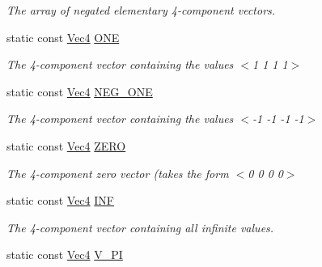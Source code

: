 \begin{DoxyCompactItemize}
\begin{DoxyCompactList}\small\item\em The array of negated elementary 4-\/component vectors. \end{DoxyCompactList}\item 
\hypertarget{structgfxmath_1_1_vec4_a8d96edc291bfe9bca2c3be29a8854540}{}static const \hyperlink{structgfxmath_1_1_vec4}{Vec4} \hyperlink{structgfxmath_1_1_vec4_a8d96edc291bfe9bca2c3be29a8854540}{O\+N\+E}\label{structgfxmath_1_1_vec4_a8d96edc291bfe9bca2c3be29a8854540}

\begin{DoxyCompactList}\small\item\em The 4-\/component vector containing the values $<$1 1 1 1$>$ \end{DoxyCompactList}\item 
\hypertarget{structgfxmath_1_1_vec4_ae4be75273eed9c0f9182ef17bac0e8df}{}static const \hyperlink{structgfxmath_1_1_vec4}{Vec4} \hyperlink{structgfxmath_1_1_vec4_ae4be75273eed9c0f9182ef17bac0e8df}{N\+E\+G\+\_\+\+O\+N\+E}\label{structgfxmath_1_1_vec4_ae4be75273eed9c0f9182ef17bac0e8df}

\begin{DoxyCompactList}\small\item\em The 4-\/component vector containing the values $<$-\/1 -\/1 -\/1 -\/1$>$ \end{DoxyCompactList}\item 
\hypertarget{structgfxmath_1_1_vec4_a0e333321044266f7ae4ae206a46a0036}{}static const \hyperlink{structgfxmath_1_1_vec4}{Vec4} \hyperlink{structgfxmath_1_1_vec4_a0e333321044266f7ae4ae206a46a0036}{Z\+E\+R\+O}\label{structgfxmath_1_1_vec4_a0e333321044266f7ae4ae206a46a0036}

\begin{DoxyCompactList}\small\item\em The 4-\/component zero vector (takes the form $<$0 0 0 0$>$ \end{DoxyCompactList}\item 
static const \hyperlink{structgfxmath_1_1_vec4}{Vec4} \hyperlink{structgfxmath_1_1_vec4_a38e1933d9d6d5dd565a424a0a049f92e}{I\+N\+F}
\begin{DoxyCompactList}\small\item\em The 4-\/component vector containing all infinite values. \end{DoxyCompactList}\item 
\hypertarget{structgfxmath_1_1_vec4_a701ee797c358e77caf14668721acf721}{}static const \hyperlink{structgfxmath_1_1_vec4}{Vec4} \hyperlink{structgfxmath_1_1_vec4_a701ee797c358e77caf14668721acf721}{V\+\_\+\+P\+I}\label{structgfxmath_1_1_vec4_a701ee797c358e77caf14668721acf721}


\end{DoxyCompactItemize}
